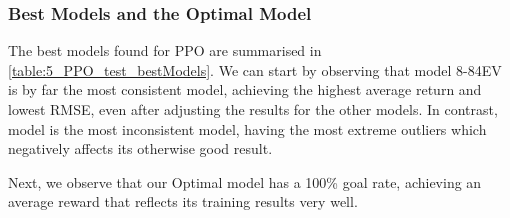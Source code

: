 \subsubsection{Best Models and the Optimal Model}
\begin{table}[hbt]
    \centering
    \caption{The best models and best hyperparameter combinations found for PPO. These are compared against our Optimal model, OP. Results that ignore episodes with an average return of less than -5 are also shown.}
    \label{table:5_PPO_test_bestModels}
\end{table}
The best models found for PPO are summarised in \cref{table:5_PPO_test_bestModels}.
We can start by observing that model 8-84EV is by far the most consistent model, achieving the highest average return and lowest RMSE, even after adjusting the results for the other models. In contrast, model \eleven is the most inconsistent model, having the most extreme outliers which negatively affects its otherwise good result.

Next, we observe that our Optimal model has a 100\% goal rate, achieving an average reward that reflects its training results very well.

